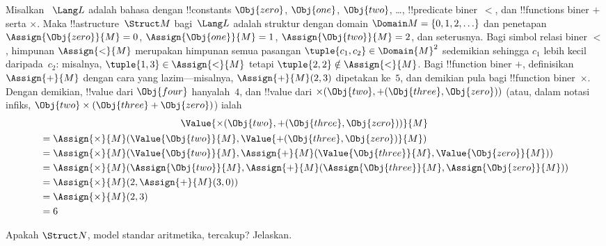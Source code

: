 \documentclass[../../../include/open-logic-section]{subfiles}
\begin{document}
\begin{ex}
Misalkan ~$\Lang L$ adalah bahasa dengan !!{constant}s $\Obj{zero}$,
$\Obj{one}$, $\Obj{two}$, \dots, !!{predicate} biner~$<$, dan
!!{function}s biner $+$ serta $\times$. Maka !!a{structure}~$\Struct M$
bagi~$\Lang L$ adalah struktur dengan domain $\Domain M = \{0, 1, 2, \ldots
\}$ dan penetapan $\Assign{\Obj{zero}}{M} = 0$,
$\Assign{\Obj{one}}{M} = 1$, $\Assign{\Obj{two}}{M} = 2$, dan seterusnya.
Bagi simbol relasi biner $<$, himpunan $\Assign{<}{M}$ merupakan himpunan
semua pasangan $\tuple{c_1, c_2} \in \Domain{M}^2$ sedemikian sehingga
$c_1$ lebih kecil daripada~$c_2$: misalnya, $\tuple{1, 3} \in
\Assign{<}{M}$ tetapi $\tuple{2, 2} \notin \Assign{<}{M}$. Bagi
!!{function} biner $+$, definisikan $\Assign{+}{M}$ dengan cara yang
lazim---misalnya, $\Assign{+}{M}(2,3)$ dipetakan ke~$5$, dan demikian pula
bagi !!{function} biner~$\times$. Dengan demikian, !!{value} dari
$\Obj{four}$ hanyalah~$4$, dan !!{value} dari $\times(\Obj{two},
+(\Obj{three},\Obj{zero}))$ (atau, dalam notasi infiks, $\Obj{two} \times
(\Obj{three} + \Obj{zero})$) ialah
\begin{multline*}
  \Value{\times(\Obj{two}, +(\Obj{three},\Obj{zero}))}{M} \\
\begin{aligned}
& =\Assign{\times}{M}(\Value{\Obj{two}}{M}, \Value{+(\Obj{three}, \Obj{zero})}{M})\\
& = \Assign{\times}{M}(\Value{\Obj{two}}{M}, \Assign{+}{M}(\Value{\Obj{three}}{M},
\Value{\Obj{zero}}{M})) \\
& = \Assign{\times}{M}(\Assign{\Obj{two}}{M}, \Assign{+}{M}(\Assign{\Obj{three}}{M},
\Assign{\Obj{zero}}{M})) \\
& = \Assign{\times}{M}(2, \Assign{+}{M}(3, 0)) \\
& = \Assign{\times}{M}(2, 3) \\
& = 6
\end{aligned}
\end{multline*}
\end{ex}

\begin{prob}
Apakah $\Struct N$, model standar aritmetika, tercakup? Jelaskan.
\end{prob}
\end{document}
